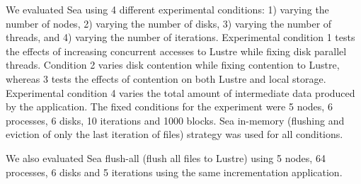 \documentclass[10pt,journal,compsoc]{IEEEtran}
\begin{document}
                                                                                   
      We evaluated Sea using 4 different experimental conditions: 1) varying the
      number of nodes, 2) varying the number of disks, 3) varying the number of
      threads, and 4) varying the number of iterations. Experimental condition 1
      tests the effects of increasing concurrent accesses to Lustre while fixing
      disk parallel threads. Condition 2 varies disk contention while fixing
      contention to Lustre, whereas 3 tests the effects of contention on both
      Lustre and local storage. Experimental condition 4 varies the total amount
      of intermediate data produced by the application. The fixed conditions for
      the experiment were 5 nodes, 6 processes, 6 disks, 10 iterations and 1000
      blocks. Sea in-memory (flushing and eviction of only the last iteration of
      files) strategy was used for all conditions.
      
      We also evaluated Sea flush-all (flush all files to Lustre) using 5 nodes,
      64 processes, 6 disks and 5 iterations using the same incrementation
      application.
\end{document}
